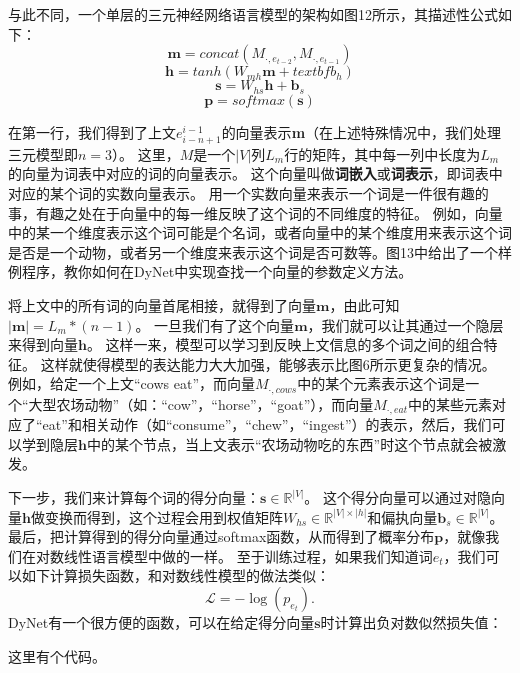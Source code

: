 \documentclass[10pt,a4paper]{ctexart}
\begin{document}
与此不同，一个单层的三元神经网络语言模型的架构如图12所示，其描述性公式如下：
\[
 \textbf{m} = concat(M_{\cdot,e_{t-2}},M_{\cdot,e_{t-1}})
\]
\[
 \textbf{h} = tanh( W_{mh}\textbf{m} + textbf{b}_h)
\]
\[
 \textbf{s} = W_{hs}\textbf{h} + \textbf{b}_s
\]
\[
 \textbf{p} = softmax(\textbf{s})
\]

在第一行，我们得到了上文$e_{i-n+1}^{i-1}$的向量表示\textbf{m}（在上述特殊情况中，我们处理三元模型即$n=3$）。
这里，$M$是一个$|V|$列$L_m$行的矩阵，其中每一列中长度为$L_m$的向量为词表中对应的词的向量表示。
这个向量叫做\textbf{词嵌入}或\textbf{词表示}，即词表中对应的某个词的实数向量表示。
用一个实数向量来表示一个词是一件很有趣的事，有趣之处在于向量中的每一维反映了这个词的不同维度的特征。
例如，向量中的某一个维度表示这个词可能是个名词，或者向量中的某个维度用来表示这个词是否是一个动物，或者另一个维度来表示这个词是否可数等。图13中给出了一个样例程序，教你如何在DyNet中实现查找一个向量的参数定义方法。

将上文中的所有词的向量首尾相接，就得到了向量$\textbf{m}$，由此可知$|\textbf{m}|=L_m * (n-1)$。
一旦我们有了这个向量$\textbf{m}$，我们就可以让其通过一个隐层来得到向量$\textbf{h}$。
这样一来，模型可以学习到反映上文信息的多个词之间的组合特征。
这样就使得模型的表达能力大大加强，能够表示比图6所示更复杂的情况。
例如，给定一个上文“cows eat”，而向量$M_{\cdot,cows}$中的某个元素表示这个词是一个“大型农场动物”（如：“cow”，“horse”，“goat”），而向量$M_{\cdot,eat}$中的某些元素对应了“eat”和相关动作（如“consume”，“chew”，“ingest”）的表示，然后，我们可以学到隐层$\textbf{h}$中的某个节点，当上文表示“农场动物吃的东西”时这个节点就会被激发。

下一步，我们来计算每个词的得分向量：$\textbf{s} \in \mathbb{R}^{|V|}$。
这个得分向量可以通过对隐向量$\textbf{h}$做变换而得到，这个过程会用到权值矩阵$W_{hs} \in \mathbb{R}^{|V| \times |h|}$和偏执向量$\textbf{b}_s \in \mathbb{R}^{|V|}$。
最后，把计算得到的得分向量通过softmax函数，从而得到了概率分布$\textbf{p}$，就像我们在对数线性语言模型中做的一样。
至于训练过程，如果我们知道词$e_t$，我们可以如下计算损失函数，和对数线性模型的做法类似：
\[
 \mathcal{L} = - \log (p_{e_t}).
\]
DyNet有一个很方便的函数，可以在给定得分向量$\textbf{s}$时计算出负对数似然损失值：

这里有个代码。
\end{document}
